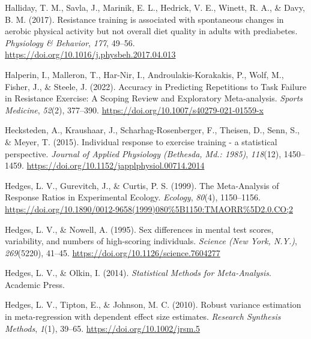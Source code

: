\documentclass[
]{article}
\newlength{\cslhangindent}
\newlength{\cslentryspacingunit} %
\newenvironment{CSLReferences}[2] %
 {%
  \setlength{\parindent}{0pt}
  \ifodd #1
  \let\oldpar\par
  \def\par{\hangindent=\cslhangindent\oldpar}
  \fi
  \setlength{\parskip}{#2\cslentryspacingunit}
 }%
 {}
\begin{document}
\begin{CSLReferences}{1}{0}
\leavevmode{}%
Halliday, T. M., Savla, J., Marinik, E. L., Hedrick, V. E., Winett, R. A., \& Davy, B. M. (2017). Resistance training is associated with spontaneous changes in aerobic physical activity but not overall diet quality in adults with prediabetes. \emph{Physiology \& Behavior}, \emph{177}, 49--56. \url{https://doi.org/10.1016/j.physbeh.2017.04.013}

\leavevmode{}%
Halperin, I., Malleron, T., Har-Nir, I., Androulakis-Korakakis, P., Wolf, M., Fisher, J., \& Steele, J. (2022). Accuracy in {Predicting} {Repetitions} to {Task} {Failure} in {Resistance} {Exercise}: {A} {Scoping} {Review} and {Exploratory} {Meta}-analysis. \emph{Sports Medicine}, \emph{52}(2), 377--390. \url{https://doi.org/10.1007/s40279-021-01559-x}

\leavevmode{}%
Hecksteden, A., Kraushaar, J., Scharhag-Rosenberger, F., Theisen, D., Senn, S., \& Meyer, T. (2015). Individual response to exercise training - a statistical perspective. \emph{Journal of Applied Physiology (Bethesda, Md.: 1985)}, \emph{118}(12), 1450--1459. \url{https://doi.org/10.1152/japplphysiol.00714.2014}

\leavevmode{}%
Hedges, L. V., Gurevitch, J., \& Curtis, P. S. (1999). The {Meta}-{Analysis} of {Response} {Ratios} in {Experimental} {Ecology}. \emph{Ecology}, \emph{80}(4), 1150--1156. \url{https://doi.org/10.1890/0012-9658(1999)080\%5B1150:TMAORR\%5D2.0.CO;2}

\leavevmode{}%
Hedges, L. V., \& Nowell, A. (1995). Sex differences in mental test scores, variability, and numbers of high-scoring individuals. \emph{Science (New York, N.Y.)}, \emph{269}(5220), 41--45. \url{https://doi.org/10.1126/science.7604277}

\leavevmode{}%
Hedges, L. V., \& Olkin, I. (2014). \emph{Statistical {Methods} for {Meta}-{Analysis}}. Academic Press.

\leavevmode{}%
Hedges, L. V., Tipton, E., \& Johnson, M. C. (2010). Robust variance estimation in meta-regression with dependent effect size estimates. \emph{Research Synthesis Methods}, \emph{1}(1), 39--65. \url{https://doi.org/10.1002/jrsm.5}


\end{CSLReferences}
\end{document}
